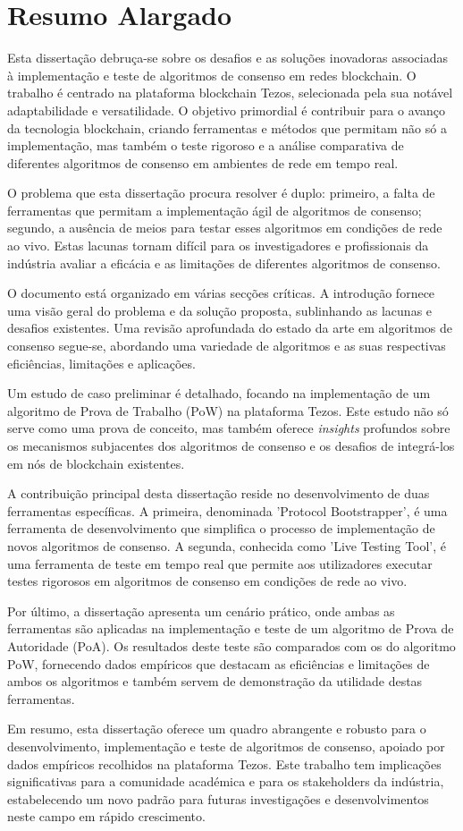 \chapter*{Resumo Alargado}
Esta dissertação debruça-se sobre os desafios e as soluções inovadoras associadas à implementação e teste de algoritmos de consenso em redes blockchain. O trabalho é centrado na plataforma blockchain Tezos, selecionada pela sua notável adaptabilidade e versatilidade. O objetivo primordial é contribuir para o avanço da tecnologia blockchain, criando ferramentas e métodos que permitam não só a implementação, mas também o teste rigoroso e a análise comparativa de diferentes algoritmos de consenso em ambientes de rede em tempo real.

O problema que esta dissertação procura resolver é duplo: primeiro, a falta de ferramentas que permitam a implementação ágil de algoritmos de consenso; segundo, a ausência de meios para testar esses algoritmos em condições de rede ao vivo. Estas lacunas tornam difícil para os investigadores e profissionais da indústria avaliar a eficácia e as limitações de diferentes algoritmos de consenso.

O documento está organizado em várias secções críticas. A introdução fornece uma visão geral do problema e da solução proposta, sublinhando as lacunas e desafios existentes. Uma revisão aprofundada do estado da arte em algoritmos de consenso segue-se, abordando uma variedade de algoritmos e as suas respectivas eficiências, limitações e aplicações.

Um estudo de caso preliminar é detalhado, focando na implementação de um algoritmo de Prova de Trabalho (PoW) na plataforma Tezos. Este estudo não só serve como uma prova de conceito, mas também oferece \textit{insights} profundos sobre os mecanismos subjacentes dos algoritmos de consenso e os desafios de integrá-los em nós de blockchain existentes.

A contribuição principal desta dissertação reside no desenvolvimento de duas ferramentas específicas. A primeira, denominada 'Protocol Bootstrapper', é uma ferramenta de desenvolvimento que simplifica o processo de implementação de novos algoritmos de consenso. A segunda, conhecida como 'Live Testing Tool', é uma ferramenta de teste em tempo real que permite aos utilizadores executar testes rigorosos em algoritmos de consenso em condições de rede ao vivo.

Por último, a dissertação apresenta um cenário prático, onde ambas as ferramentas são aplicadas na implementação e teste de um algoritmo de Prova de Autoridade (PoA). Os resultados deste teste são comparados com os do algoritmo PoW, fornecendo dados empíricos que destacam as eficiências e limitações de ambos os algoritmos e também servem de demonstração da utilidade destas ferramentas.

Em resumo, esta dissertação oferece um quadro abrangente e robusto para o desenvolvimento, implementação e teste de algoritmos de consenso, apoiado por dados empíricos recolhidos na plataforma Tezos. Este trabalho tem implicações significativas para a comunidade académica e para os stakeholders da indústria, estabelecendo um novo padrão para futuras investigações e desenvolvimentos neste campo em rápido crescimento.

